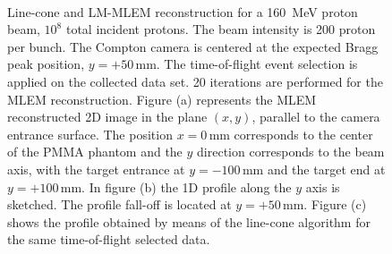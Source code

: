 \begin{figure}
\centering
{}
\\
\caption{Line-cone and LM-MLEM reconstruction for a 160~MeV proton beam, $10^{8}$ total incident protons. The beam intensity is 200 proton per bunch. The Compton camera is centered at the expected Bragg peak position, $y=+50\,$mm. The time-of-flight event selection is applied on the collected data set. 20 iterations are performed for the MLEM reconstruction.
Figure (a) represents the MLEM reconstructed 2D image in the plane $(x,y)$, parallel to the camera entrance surface. The position $x=0\,$mm corresponds to the center of the PMMA phantom and the $y$ direction corresponds to the beam axis, with the target entrance at $y=-100\,$mm and the target end at $y=+100\,$mm.  In figure (b) the 1D profile along the $y$ axis is sketched. The profile fall-off is located at $y=+50\,$mm. Figure (c) shows the profile obtained by means of the line-cone algorithm for the same time-of-flight selected data.}
\label{fig:comparison}
\end{figure}


